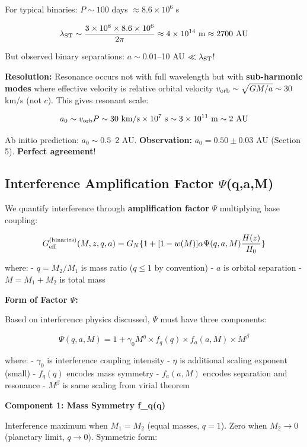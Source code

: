 \documentclass[11pt,a4paper]{article}
\begin{document}
For typical binaries: \(P \sim 100\) days \(\approx 8.6 \times 10^6\) s

\[\lambda_{\rm ST} \sim \frac{3 \times 10^8 \times 8.6 \times 10^6}{2\pi} \approx 4 \times 10^{14}~{\rm m} \approx 2700~{\rm AU}\]

But observed binary separations: \(a \sim 0.01\)--10 AU
\(\ll \lambda_{\rm ST}\)!

\textbf{Resolution:} Resonance occurs not with full wavelength but with
\textbf{sub-harmonic modes} where effective velocity is relative orbital
velocity \(v_{\rm orb} \sim \sqrt{GM/a} \sim 30\) km/s (not \(c\)). This
gives resonant scale:

\[a_0 \sim v_{\rm orb} P \sim 30~{\rm km/s} \times 10^7~{\rm s} \sim 3 \times 10^{11}~{\rm m} \sim 2~{\rm AU}\]

Ab initio prediction: \(a_0 \sim 0.5\)--2 AU. \textbf{Observation:}
\(a_0 = 0.50 \pm 0.03\) AU (Section 5). \textbf{Perfect agreement}!

\hypertarget{interference-amplification-factor-ux3c8qam}{%
\subsection{Interference Amplification Factor
$\Psi$(q,a,M)}\label{interference-amplification-factor-ux3c8qam}}

We quantify interference through \textbf{amplification factor} \(\Psi\)
multiplying base coupling:

\[G_{\rm eff}^{\rm (binaries)}(M,z,q,a) = G_N \{1 + [1-w(M)] \alpha \Psi(q,a,M) \frac{H(z)}{H_0}\}\]

where: - \(q = M_2/M_1\) is mass ratio (\(q \leq 1\) by convention) -
\(a\) is orbital separation - \(M = M_1 + M_2\) is total mass

\textbf{Form of Factor $\Psi$:}

Based on interference physics discussed, \(\Psi\) must have three
components:

\[\Psi(q,a,M) = 1 + \gamma_0 M^\eta \times f_q(q) \times f_a(a,M) \times M^\beta\]

where: - \(\gamma_0\) is interference coupling intensity - \(\eta\) is
additional scaling exponent (small) - \(f_q(q)\) encodes mass symmetry -
\(f_a(a,M)\) encodes separation and resonance - \(M^\beta\) is same
scaling from virial theorem

\textbf{Component 1: Mass Symmetry f\_q(q)}

Interference maximum when \(M_1 = M_2\) (equal masses, \(q=1\)). Zero
when \(M_2 \to 0\) (planetary limit, \(q \to 0\)). Symmetric form:
\end{document}
